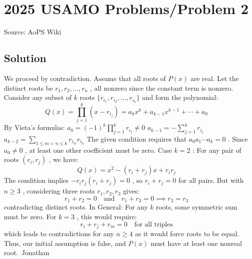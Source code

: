 \documentclass[12pt]{article}
\begin{document}
\section*{{2025 USAMO Problems/Problem 2}}
Source: AoPS Wiki

\subsection*{Solution}
We proceed by contradiction. Assume that all roots of $P(x)$ are real. Let the distinct roots be $r_1, r_2, \ldots, r_n$ , all nonzero since the constant term is nonzero. Consider any subset of $k$ roots $\{r_{i_1}, r_{i_2}, \ldots, r_{i_k}\}$ and form the polynomial: \[Q(x) = \prod_{j=1}^k (x - r_{i_j}) =a_{k} x^k + a_{k-1}x^{k-1} + \cdots + a_0\] By Vieta's formulas: $a_0 = (-1)^k \prod_{j=1}^k r_{i_j} \neq 0$ $a_{k-1} = -\sum_{j=1}^k r_{i_j}$ $a_{k-2} = \sum_{1\leq m<n\leq k} r_{i_m}r_{i_n}$ The given condition requires that $a_0a_1\cdots a_k = 0$ . Since $a_0 \neq 0$ , at least one other coefficient must be zero. Case $k=2$ :
For any pair of roots $(r_i, r_j)$ , we have: \[Q(x) = x^2 - (r_i+r_j)x + r_ir_j\] The condition implies $-r_ir_j(r_i+r_j) = 0$ , so $r_i + r_j = 0$ for all pairs. But with $n \geq 3$ , considering three roots $r_1, r_2, r_3$ gives: \[r_1 + r_2 = 0 \quad \text{and} \quad r_1 + r_3 = 0 \implies r_2 = r_3\] contradicting distinct roots.
In General:
For any $k$ roots, some symmetric sum must be zero. For $k=3$ , this would require: \[r_i + r_j + r_m = 0 \quad \text{for all triples}\] which leads to contradictions for any $n \geq 4$ as it would force roots to be equal. Thus, our initial assumption is false, and $P(x)$ must have at least one nonreal root.~Jonathan
\end{document}
